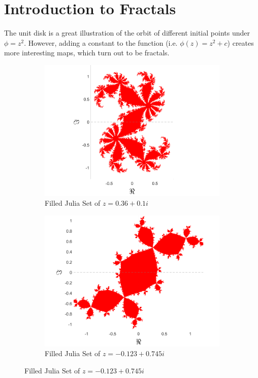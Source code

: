 \documentclass[letterpaper,11pt]{article}
\begin{document}
\section{Introduction to Fractals}
The unit disk is a great illustration of the orbit of different initial points under $\phi=z^2$. However, adding a constant to the function (i.e. $\phi(z) = z^2 + c$) creates more interesting maps, which turn out to be fractals. 

\begin{figure}
\centering
	\begin{subfigure}[b]{0.49\linewidth}
		\includegraphics[width=\linewidth]{../Figures/FilledJulia1.png}
		\caption{Filled Julia Set of $z = 0.36 + 0.1i$}
		\label{fig:FJ+.36+.1i}
	\end{subfigure}
	\begin{subfigure}[b]{0.49\linewidth}
		\includegraphics[width=\linewidth]{../Figures/FilledJulia2.png}
		\caption{Filled Julia Set of $z = -0.123 + 0.745i$}
		\label{fig:FJ+.123+.745i}
	\end{subfigure}
	

\end{figure}
\end{document}

